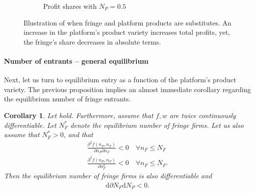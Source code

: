 \documentclass[a4paper]{article}
\newtheorem{corollary}{Corollary}
\newcommand{\dd}{\mathrm{d}}
\begin{document}
\begin{figure}[ht]
\begin{subfigure}[b]{0.45\textwidth}
        \caption{Profit shares with $N_P = 0.5$}
    \end{subfigure}
    \caption{Illustration of  when fringe and platform products are substitutes. An increase in the platform's product variety increases total profits, yet, the fringe's share decreases in absolute terms.}
    \label{fig:increase_N_P_fringe}
\end{figure}



\paragraph{Number of entrants -- general equilibrium}
Next, let us turn to equilibrium entry as a function of the platform's product variety.
The previous proposition implies an almost immediate corollary regarding the equilibrium number of fringe entrants.
\begin{corollary}
    \label{cor:fringe_entry}
    Let  hold.
    Furthermore, assume that $f, w$ are twice continuously differentiable.
    Let $N_F^*$ denote the equilibrium number of fringe firms.
    Let us also assume that $N_F^* > 0$, and that
    \begin{align*}
        \frac{\partial^2 f(n_P, n_F)}{\partial n_P \partial n_F} < 0 \quad \forall n_F \leq N_F \\
        \frac{\partial^2 f(n_P, n_F)}{\partial n_F^2} < 0 \quad \forall n_F \leq N_F.
    \end{align*}
    Then the equilibrium number of fringe firms is also differentiable and
    \begin{align*}
        \dd{\partial N_F}{\dd N_P} < 0.
    \end{align*}
\end{corollary}
\end{document}
